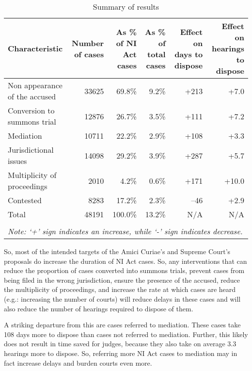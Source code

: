 \documentclass[11pt,a4paper]{article}
\begin{document}
{\footnotesize \begin{longtable}{@{}p{2.5cm}rrrrr}
 \caption{Summary of results}\label{tab:summary_results}\\
 \toprule
 \textbf{Characteristic} & \multicolumn{1}{p{2cm}}{\textbf{Number of cases}} &
 \multicolumn{1}{p{2cm}}{\textbf{As \% of NI Act cases}}
 & \multicolumn{1}{p{2cm}}{\textbf{As \% of total cases}}
 & \multicolumn{1}{p{2cm}}{\textbf{Effect on days to dispose}} &
 \multicolumn{1}{p{2cm}}{\textbf{Effect on hearings to dispose}}
 \\
 \midrule
 Non appearance of the accused & 33625 & 69.8\% & 9.2\% & +213 & +7.0 \\ \midrule
 Conversion to summons trial & 12876 & 26.7\% & 3.5\% & +111 & +7.2 \\ \midrule
 Mediation & 10711 & 22.2\% & 2.9\% & +108 & +3.3 \\ \midrule
 Jurisdictional issues & 14098 & 29.2\% & 3.9\% & +287 & +5.7 \\ \midrule
 Multiplicity of proceedings & 2010 & 4.2\% & 0.6\% & +171 & +10.0 \\ \midrule
 Contested & 8283 & 17.2\% & 2.3\% & --46 & +2.9 \\ \midrule
 Total & 48191 & 100.0\% & 13.2\% & N/A & N/A \\
 \bottomrule
 \\
 \multicolumn{6}{l}{{\footnotesize \emph{Note: `+' sign
 indicates an increase, while `-' sign indicates decrease.}}}\\
\end{longtable}
}

So, most of the intended targets of the Amici Curiae's and Supreme Court's proposals do increase the duration of NI Act cases. So, any interventions that can reduce the proportion of cases converted into summons trials, prevent cases from being filed in the wrong jurisdiction, ensure the presence of the accused, reduce the multiplicity of proceedings, and increase the rate at which cases are heard (e.g.: increasing the number of courts) will reduce delays in these cases and will also reduce the number of hearings required to dispose of them.

A striking departure from this are cases referred to mediation. These cases take 108 days more to dispose than cases not referred to mediation. Further, this likely does not result in time saved for judges, because they also take on average 3.3 hearings more to dispose. So, referring more NI Act cases to mediation may in fact increase delays and burden courts even more.
\end{document}
